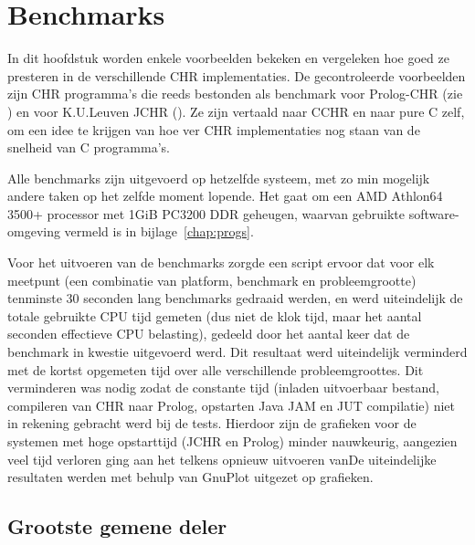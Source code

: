 \chapter{Benchmarks} \label{chap:bench}

\newcommand{\benchfig}[2]{
\begin{figure}[htbp]
\begin{center}
\includevector{1}{fig/bench-#1}
\caption{\label{fig:bench-#1}#2}
\end{center}
\end{figure}
}

In dit hoofdstuk worden enkele voorbeelden bekeken en vergeleken hoe goed ze presteren in de verschillende CHR implementaties. De gecontroleerde voorbeelden zijn CHR programma's die reeds bestonden als benchmark voor Prolog-CHR (zie \cite{tom:benchmarks}) en voor K.U.Leuven JCHR (\cite{peter:benchmarks}). Ze zijn vertaald naar CCHR en naar pure C zelf, om een idee te krijgen van hoe ver CHR implementaties nog staan van de snelheid van C programma's.

Alle benchmarks zijn uitgevoerd op hetzelfde systeem, met zo min mogelijk andere taken op het zelfde moment lopende. Het gaat om een AMD Athlon64 3500+ processor met 1GiB PC3200 DDR geheugen, waarvan gebruikte software-omgeving vermeld is in bijlage~\ref{chap:progs}.

Voor het uitvoeren van de benchmarks zorgde een script ervoor dat voor elk meetpunt (een combinatie van platform, benchmark en probleemgrootte) tenminste 30 seconden lang benchmarks gedraaid werden, en werd uiteindelijk de totale gebruikte CPU tijd gemeten (dus niet de klok tijd, maar het aantal seconden effectieve CPU belasting), gedeeld door het aantal keer dat de benchmark in kwestie uitgevoerd werd. Dit resultaat werd uiteindelijk verminderd met de kortst opgemeten tijd over alle verschillende probleemgroottes. Dit verminderen was nodig zodat de constante tijd (inladen uitvoerbaar bestand, compileren van CHR naar Prolog, opstarten Java JAM en JUT compilatie) niet in rekening gebracht werd bij de tests. Hierdoor zijn de grafieken voor de systemen met hoge opstarttijd (JCHR en Prolog) minder nauwkeurig, aangezien veel tijd verloren ging aan het telkens opnieuw uitvoeren vanDe uiteindelijke resultaten werden met behulp van GnuPlot uitgezet op grafieken.

\section{Grootste gemene deler} \label{sec:bench-gcd}

